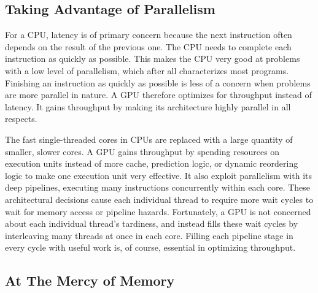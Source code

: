 \documentclass[../main/report.tex]{subfiles}
\begin{document}
\subsection{Taking Advantage of Parallelism}

For a CPU, latency is of primary concern because the next instruction often depends on the result of the previous one.
The CPU needs to complete each instruction as quickly as possible.
This makes the CPU very good at problems with a low level of parallelism, which after all characterizes most programs.
Finishing an instruction as quickly as possible is less of a concern when problems are more parallel in nature.
A GPU therefore optimizes for throughput instead of latency.
It gains throughput by making its architecture highly parallel in all respects.

The fast single-threaded cores in CPUs are replaced with a large quantity of smaller, slower cores.
A GPU gains throughput by spending resources on execution units instead of more cache, prediction logic, or dynamic reordering logic to make one execution unit very effective.
It also exploit parallelism with its deep pipelines, executing many instructions concurrently within each core.
These architectural decisions cause each individual thread to require more wait cycles to wait for memory access or pipeline hazards.
Fortunately, a GPU is not concerned about each individual thread's tardiness, and instead fills these wait cycles by interleaving many threads at once in each core.
Filling each pipeline stage in every cycle with useful work is, of course, essential in optimizing throughput.


\subsection{At The Mercy of Memory}


\end{document}
